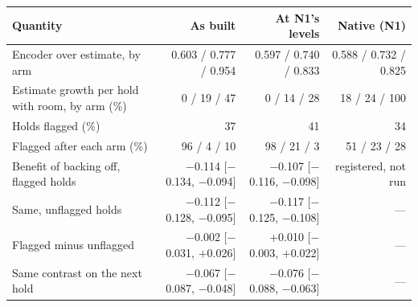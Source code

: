 \begin{tabular}{lrrr}
\toprule
Quantity & As built & At N1's levels & Native (N1) \\
\midrule
Encoder over estimate, by arm & 0.603 / 0.777 / 0.954 & 0.597 / 0.740 / 0.833 & 0.588 / 0.732 / 0.825 \\
Estimate growth per hold with room, by arm (\%) & 0 / 19 / 47 & 0 / 14 / 28 & 18 / 24 / 100 \\
Holds flagged (\%) & 37 & 41 & 34 \\
Flagged after each arm (\%) & 96 / 4 / 10 & 98 / 21 / 3 & 51 / 23 / 28 \\
\midrule
Benefit of backing off, flagged holds & $-$0.114 [$-$0.134, $-$0.094] & $-$0.107 [$-$0.116, $-$0.098] & registered, not run \\
Same, unflagged holds & $-$0.112 [$-$0.128, $-$0.095] & $-$0.117 [$-$0.125, $-$0.108] & --- \\
Flagged minus unflagged & $-$0.002 [$-$0.031, $+$0.026] & $+$0.010 [$-$0.003, $+$0.022] & --- \\
Same contrast on the next hold & $-$0.067 [$-$0.087, $-$0.048] & $-$0.076 [$-$0.088, $-$0.063] & --- \\
\bottomrule
\end{tabular}
